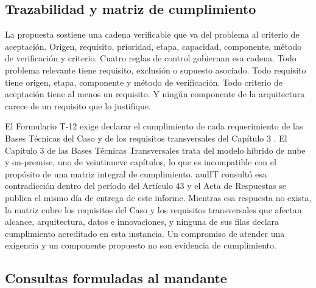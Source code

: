 \subsection{Trazabilidad y matriz de cumplimiento}

La propuesta sostiene una cadena verificable que va del problema al criterio de aceptación. Origen,
requisito, prioridad, etapa, capacidad, componente, método de verificación y criterio. Cuatro
reglas de control gobiernan esa cadena. Todo problema relevante tiene requisito, exclusión o
supuesto asociado. Todo requisito tiene origen, etapa, componente y método de verificación. Todo
criterio de aceptación tiene al menos un requisito. Y ningún componente de la arquitectura carece
de un requisito que lo justifique.

El Formulario T-12 exige declarar el cumplimiento de cada requerimiento de las Bases Técnicas del
Caso y de los requisitos transversales del Capítulo 3 \parencite{bases_admin_2026}. El Capítulo 3
de las Bases Técnicas Transversales trata del modelo híbrido de nube y on-premise, uno de
veintinueve capítulos, lo que es incompatible con el propósito de una matriz integral de
cumplimiento. audIT consultó esa contradicción dentro del período del Artículo 43 y el Acta de
Respuestas se publica el mismo día de entrega de este informe. Mientras esa respuesta no exista, la
matriz cubre los requisitos del Caso y los requisitos transversales que afectan alcance,
arquitectura, datos e innovaciones, y ninguna de sus filas declara cumplimiento acreditado en esta
instancia. Un compromiso de atender una exigencia y un componente propuesto no son evidencia de
cumplimiento.

\subsection{Consultas formuladas al mandante}


